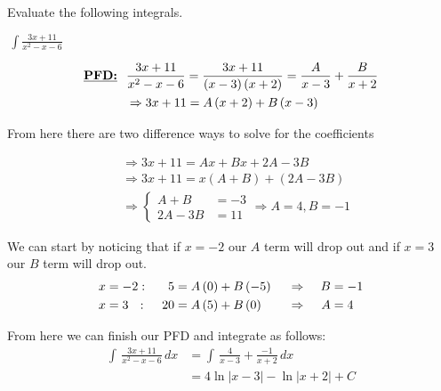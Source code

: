 \documentclass[addpoints]{exam}
\theoremstyle{definition}
\theoremstyle{plain}
\begin{document}
Evaluate the following integrals.
\begin{questions}
    \question $\displaystyle\,\int\frac{3x+11}{x^2-x-6}$
    \begin{solution}[\stretch{1}]
        \begin{align*}
            \textbf{\underline{PFD:}} \hspace{0.1in} &\frac{3x+11}{x^2-x-6} = \frac{3x+11}{\left(x-3\right)\left(x+2\right)} = \frac{A}{x-3} + \frac{B}{x+2} \\
            &\Rightarrow 3x+11 = A\left(x+2\right) + B\left(x-3\right)
        \end{align*}
        
        From here there are two difference ways to solve for the coefficients
        
        \begin{minipage}{0.45\linewidth}
            \begin{align*}
                &\Rightarrow 3x+11 = Ax + Bx + 2A - 3B \\
                &\Rightarrow 3x+11 = x(A+B) + (2A - 3B) \\
                &\Rightarrow \begin{cases}
                    A + B &= -3 \\
                    2A - 3B &= 11
                \end{cases}
                \Rightarrow A=4, B=-1
            \end{align*}
        \end{minipage}
        \hfill
        \begin{minipage}{0.45\linewidth}
            We can start by noticing that if $x=-2$ our $A$ term will drop out and if $x=3$ our $B$ term will drop out. 
            \begin{align*}x & =  - 2 : & \hspace{0.05in}5 & = A\left( 0 \right) + B\left( { - 5} \right) & \hspace{0.05in}  & \Rightarrow & \hspace{0.05in}B & =  - 1\\ x & = 3 \,\,\,\,: & \hspace{0.05in}20 & = A\left( 5 \right) + B\left( 0 \right) & \hspace{0.05in} & \Rightarrow & \hspace{0.05in}A & = 4\end{align*}
        \end{minipage}
        \vspace{0.1in}
        \newline
        From here we can finish our PFD and integrate as follows:
        \begin{align*}
            \int\,\frac{3x+11}{x^2-x-6}\,dx &= \int\,\frac{4}{x-3} + \frac{-1}{x+2}\,dx \\
            &= \boxed{4\ln\left|x-3\right| - \ln\left|x+2\right| + C}
        \end{align*}
    \end{solution}


\end{questions}
\end{document}
